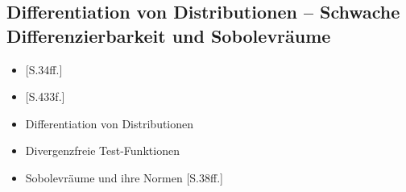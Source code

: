 \subsection{Differentiation von Distributionen -- Schwache Differenzierbarkeit und Sobolevräume}

\begin{itemize}
  \item \cite{sohr2001navier}[S.34ff.]
  \item \cite{werner2011fa}[S.433f.]
  \item Differentiation von Distributionen
  \item Divergenzfreie Test-Funktionen
  \item Sobolevräume und ihre Normen \cite{sohr2001navier}[S.38ff.]
\end{itemize}

